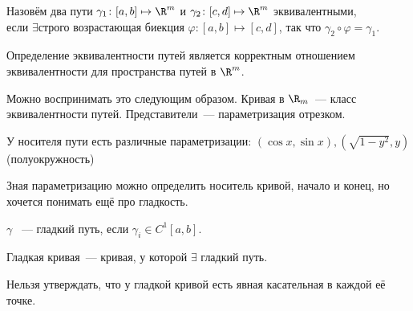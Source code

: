 \begin{definition}
    Назовём два пути $\gamma_1\colon [a,b]\mapsto \R^m$ и
    $\gamma_2\colon [c,d]\mapsto \R^m$ эквивалентными,\\
    если $\exists \text{строго возрастающая биекция }
    \varphi\colon [a,b]\mapsto[c, d]$, так что 
    $\gamma_2\circ \varphi = \gamma_1$.
\end{definition}
\begin{remark}
    Определение эквивалентности путей является корректным отношением эквивалентности для пространства путей в $\R^m$.

    Можно воспринимать это следующим образом.
    Кривая в $\R_m$~--- класс эквивалентности путей. Представители~--- параметризация отрезком.
\end{remark}
\begin{example}
    У носителя пути есть различные параметризации:
    $(\cos x, \sin x), (\sqrt{1 - y^2}, y)$(полуокружность)
\end{example}
\begin{remark}
    Зная параметризацию можно определить носитель кривой,
    начало и конец, но хочется понимать ещё про гладкость.
\end{remark}
\begin{definition}
    $\gamma$ ~--- гладкий путь, если $\gamma_i\in C^1[a,b]$.
\end{definition}
\begin{definition}
    Гладкая кривая~--- кривая, у которой $\exists$ гладкий путь.
\end{definition}
\begin{remark}
    Нельзя утверждать, что у гладкой кривой есть явная касательная
    в каждой её точке.
\end{remark}
